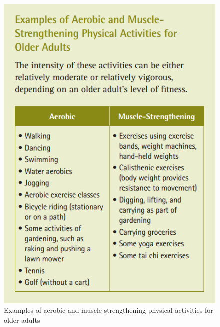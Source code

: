 \begin{figure}
\begin{center}
\includegraphics[scale=0.6]{typeofexercise}
\caption[Examples of aerobic and muscle-strengthening physical activities for 
older adults ]{Examples of aerobic and muscle-strengthening physical activities for 
older adults \cite{guidelines}}
\label{fig:typeofexercise}
\end{center}
\end{figure} 

